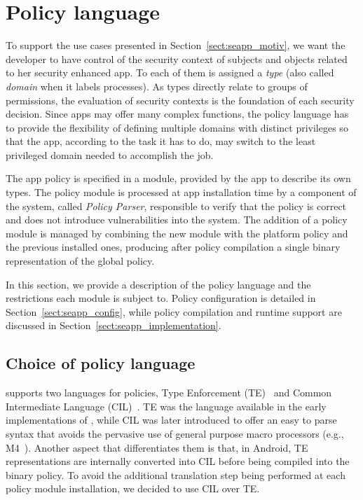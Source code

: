 \section{Policy language} \label{sect:seapp_lang}

To support the use cases presented in Section~\ref{sect:seapp_motiv},
we want the developer to have control of the \sel security context of
subjects and objects related to her security enhanced app.  To each of
them is assigned a {\em type} (also called {\em domain} when it labels
processes).  As types directly relate to groups of permissions, the
evaluation of security contexts is the foundation of each security
decision.  Since apps may offer many complex functions, the policy
language has to provide the flexibility of defining multiple domains
with distinct privileges so that the app, according to the task it has
to do, may switch to the least privileged domain needed to accomplish
the job.

The app policy is specified in a module, provided by the app to
describe its own types.  The policy module is processed at app
installation time by a component of the system, called {\em \seapp
  Policy Parser}, responsible to verify that the policy is correct and
does not introduce vulnerabilities into the system.  The addition of a
policy module is managed by combining the new module with the platform
policy and the previous installed ones, producing after policy
compilation a single binary representation of the global policy.

In this section, we provide a description of the \seapp policy language
and the restrictions each module is subject to.  Policy configuration
is detailed in Section~\ref{sect:seapp_config}, while policy
compilation and runtime support are discussed in
Section~\ref{sect:seapp_implementation}.

\subsection{Choice of policy language}\label{seapp_lang}

\sea supports two languages for policies, Type Enforcement
(TE)~\cite{seapp_libte_rules} and Common Intermediate Language
(CIL)~\cite{seapp_cil}.  TE was the language available in the early
implementations of \sel, while CIL was later introduced to offer an
easy to parse syntax that avoids the pervasive use of general purpose
macro processors (e.g., M4~\cite{seapp_m4}).  Another aspect that
differentiates them is that, in Android, TE representations are
internally converted into CIL before being compiled into the \sel
binary policy.  To avoid the additional translation step being
performed at each policy module installation, we decided to use CIL
over TE.

